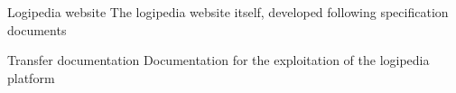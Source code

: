 \begin{workpackage}[id=access,wphases=0-48,type=MGT,
  short=Access,%
  title={Access to the infrastructure},
  lead=Inr,
  InrRM=28,%
  OcaRM=6]
\begin{wpdelivs}
  \begin{wpdeliv}[due=48,miles=???,id=website,dissem=PU,nature=D,lead=Irt]{Logipedia website}
    The logipedia website itself, developed following specification documents
  \end{wpdeliv}
  
  \begin{wpdeliv}[due=48,miles=???,id=transfer-doc,dissem=PU,nature=R,lead=Irt]{Transfer documentation}
    Documentation for the exploitation of the logipedia platform
  \end{wpdeliv}
  
\end{wpdelivs}

\end{workpackage}

